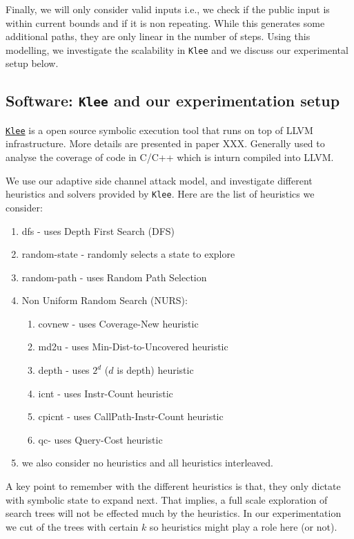 \documentclass[11pt,a4paper,notitlepage]{article}
\begin{document}
Finally, we will only consider valid inputs i.e., we check if the public input is within current bounds and if it is non repeating.
While this generates some additional paths, they are only linear in the number of steps.
Using this modelling, we investigate the scalability in \texttt{Klee} and we discuss our experimental setup below.

\subsection{Software: \texttt{Klee} and our experimentation setup}
\label{subsec:softwares}

\href{https://klee.github.io/}{\texttt{Klee}} is a open source symbolic execution tool that runs on top of LLVM infrastructure.
More details are presented in paper XXX.
Generally used to analyse the coverage of code in C/C++ which is inturn compiled into LLVM. 

We use our adaptive side channel attack model, and investigate different heuristics and solvers provided by \texttt{Klee}.
Here are the list of heuristics we consider:
\begin{enumerate}
\item dfs - uses Depth First Search (DFS)
\item random-state - randomly selects a state to explore
\item random-path - uses Random Path Selection
\item Non Uniform Random Search (NURS):
  \begin{enumerate}
  \item covnew - uses Coverage-New heuristic
  \item md2u - uses Min-Dist-to-Uncovered heuristic
  \item depth - uses $2^d$ ($d$ is depth) heuristic
  \item icnt - uses Instr-Count heuristic
  \item cpicnt - uses CallPath-Instr-Count heuristic
  \item qc- uses Query-Cost heuristic
  \end{enumerate}
\item we also consider no heuristics and all heuristics interleaved.
\end{enumerate}

A key point to remember with the different heuristics is that, they only dictate with symbolic state to expand next.
That implies, a full scale exploration of search trees will not be effected much by the heuristics.
In our experimentation we cut of the trees with certain $k$ so heuristics might play a role here (or not).
\end{document}
